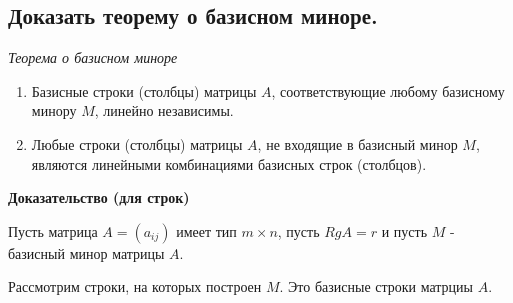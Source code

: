 \subsection{Доказать теорему о базисном миноре.}
\textit {Теорема о базисном миноре}
\begin{enumerate}
    \item Базисные строки (столбцы) матрицы $A$, соответствующие любому базисному минору $M$, линейно независимы.
    \item Любые строки (столбцы) матрицы $A$, не входящие в базисный минор $M$, являются линейными комбинациями базисных строк (столбцов).
\end{enumerate}

\vspace*{15pt}

{\bf{Доказательство (для строк)}}

\vspace*{15pt}

Пусть матрица $A = (a_{ij})$ имеет тип $m \times n$, пусть $RgA = r$ и пусть $M$ - базисный минор матрицы $A$.

Рассмотрим строки, на которых построен $M$. Это базисные строки матрциы $A$.

